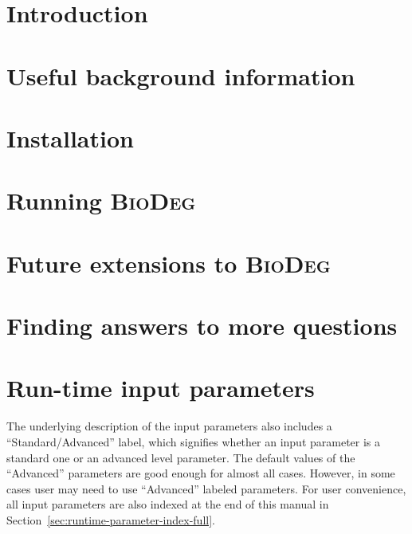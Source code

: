 \documentclass{article}
\newcommand{\biodeg}{\textsc{BioDeg}}
\begin{document}
\pagebreak

\onehalfspacing

\tableofcontents

\pagebreak

\section{Introduction}
\label{sec:intro}


\section{Useful background information}
\label{sec:background}


\section{Installation}
\label{sec:installation}


\section{Running \biodeg}
\label{sec:run}


\section{Future extensions to \biodeg}
\label{sec:future}


\section{Finding answers to more questions}
\label{sec:questions-and-answers}


\appendix

\section{Run-time input parameters}
\label{sec:parameters}
The underlying description of the input parameters also includes a ``Standard/Advanced'' label, which signifies whether an input parameter is a standard one or an advanced level parameter. The default values of the ``Advanced'' parameters are good enough for almost all cases. However, in some cases user may need to use ``Advanced'' labeled parameters. For user convenience, all input parameters are also indexed at the end of this manual in Section~\ref{sec:runtime-parameter-index-full}.



\pagebreak


\printindex[prmindexfull]
\end{document}
